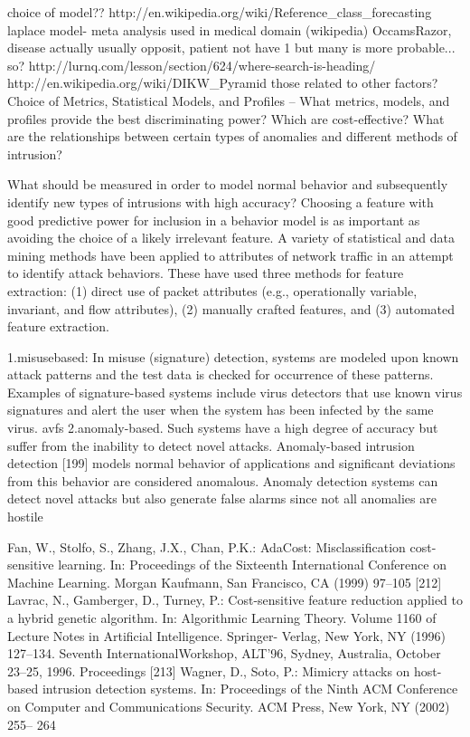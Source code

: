 \documentclass[12pt]{article}
\begin{document}
choice of model?? http://en.wikipedia.org/wiki/Reference_class_forecasting
laplace model- meta analysis used in medical domain (wikipedia)
OccamsRazor, disease actually usually opposit, patient not have 1 but many is
more probable... so?
http://lurnq.com/lesson/section/624/where-search-is-heading/
http://en.wikipedia.org/wiki/DIKW_Pyramid
those related to other factors?
Choice of Metrics, Statistical Models, and Profiles – What metrics,
models, and profiles provide the best discriminating power? Which
are cost-effective? What are the relationships between certain types
of anomalies and different methods of intrusion?

What should be measured in order to model normal behavior and subsequently
identify new types of intrusions with high accuracy? Choosing a feature with
good predictive power for inclusion in a behavior model is as important as
avoiding the choice of a likely irrelevant feature.
A variety of statistical and data mining methods have been applied to attributes
of network traffic in an attempt to identify attack behaviors. These
have used three methods for feature extraction: (1) direct use of packet attributes
(e.g., operationally variable, invariant, and flow attributes), (2) manually
crafted features, and (3) automated feature extraction.

1.misusebased: In misuse (signature) detection, systems are modeled
upon known attack patterns and the test data is checked for occurrence
of these patterns. Examples of signature-based systems include virus detectors
that use known virus signatures and alert the user when the system has
been infected by the same virus.
avfs
2.anomaly-based.  Such systems have a high degree of accuracy
but suffer from the inability to detect novel attacks. Anomaly-based intrusion
detection [199] models normal behavior of applications and significant
deviations from this behavior are considered anomalous. Anomaly detection
systems can detect novel attacks but also generate false alarms since not all
anomalies are hostile

Fan, W., Stolfo, S., Zhang, J.X., Chan, P.K.: AdaCost: Misclassification
cost-sensitive learning. In: Proceedings of the Sixteenth International
Conference on Machine Learning. Morgan Kaufmann, San Francisco,
CA (1999) 97–105
[212] Lavrac, N., Gamberger, D., Turney, P.: Cost-sensitive feature reduction
applied to a hybrid genetic algorithm. In: Algorithmic Learning Theory.
Volume 1160 of Lecture Notes in Artificial Intelligence. Springer-
Verlag, New York, NY (1996) 127–134. Seventh InternationalWorkshop,
ALT’96, Sydney, Australia, October 23–25, 1996. Proceedings
[213] Wagner, D., Soto, P.: Mimicry attacks on host-based intrusion detection
systems. In: Proceedings of the Ninth ACM Conference on Computer
and Communications Security. ACM Press, New York, NY (2002) 255–
264
\end{document}
